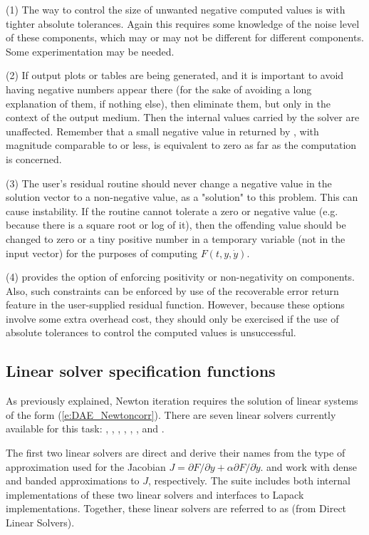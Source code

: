 (1) The way to control the size of unwanted negative computed values
is with tighter absolute tolerances.  Again this requires some
knowledge of the noise level of these components, which may or may not
be different for different components.  Some experimentation may be
needed.

(2) If output plots or tables are being generated, and it is important
to avoid having negative numbers appear there (for the sake of avoiding
a long explanation of them, if nothing else), then eliminate them, but
only in the context of the output medium.  Then the internal values carried
by the solver are unaffected.  Remember that a small negative value in 
returned by {\idas}, with magnitude comparable to  or less,
is equivalent to zero as far as the computation is concerned.

(3) The user's residual routine  should never change a
negative value in the solution vector  to a non-negative value,
as a "solution" to this problem.  This can cause instability.  If the
 routine cannot tolerate a zero or negative value (e.g. because
there is a square root or log of it), then the offending value should
be changed to zero or a tiny positive number in a temporary variable
(not in the input  vector) for the purposes of computing $F(t,y,\dot{y})$.

(4) {\idas} provides the option of enforcing positivity or non-negativity
on components.  Also, such constraints can be enforced by use of the
recoverable error return feature in the user-supplied residual function.
However, because these options involve some extra overhead cost, they
should only be exercised if the use of absolute tolerances to control
the computed values is unsuccessful.
\subsection{Linear solver specification functions}\label{sss:lin_solv_init}

As previously explained, Newton iteration requires the solution of
linear systems of the form (\ref{e:DAE_Newtoncorr}).  There are seven
{\idas} linear solvers currently available for this task: {\idadense},
{\idaband}, {\idaklu}, {\idasuperlumt}, {\idaspgmr}, {\idaspbcg}, and
{\idasptfqmr}.

The first two linear solvers are direct and derive their
names from the type of approximation used for the Jacobian 
$J = \partial{F}/\partial{y} + \alpha \partial{F}/\partial{\dot{y}}$.
{\idadense} and {\idaband} work with dense and banded approximations to $J$,
respectively. The {\sundials} suite includes both internal implementations of
these two linear solvers and interfaces to Lapack implementations.
Together, these linear solvers are referred to as {\idadls} (from Direct
Linear Solvers).


